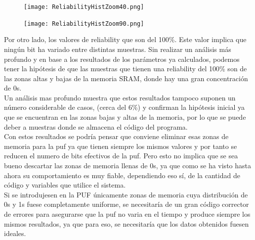 \documentclass[spanish]{template/minim}
\begin{document}
\begin{figure}[H]
    \centering
    \texttt{[image: ReliabilityHistZoom40.png]}
\end{figure}


\begin{figure}[H]
    \centering
    \texttt{[image: ReliabilityHistZoom90.png]}
\end{figure}


Por otro lado, los valores de reliability que son del 100\%. Este valor implica que ningún bit ha variado entre distintas muestras. Sin realizar un análisis más profundo y en base a los resultados de los parámetros ya calculados, podemos tener la hipótesis de que las muestras que tienen una reliability del 100\% son de las zonas altas y bajas de la memoria SRAM, donde hay una gran concentración de 0s.\\

Un análisis mas profundo muestra que estos resultados tampoco suponen un número considerable de casos, (cerca del 6\%) y confirman la hipótesis inicial ya que se encuentran en las zonas bajas y altas de la memoria, por lo que se puede deber a muestras donde se almacena el código del programa.\\

Con estos resultados se podría pensar que conviene eliminar esas zonas de memoria para la \gls{puf} ya que tienen siempre los mismos valores y por tanto se reducen el numero de bits efectivos de la \gls{puf}. Pero esto no implica que se sea bueno descartar las zonas de memoria llenas de 0s, ya que como se ha visto hasta ahora su comportamiento es muy fiable, dependiendo eso sí, de la cantidad de código y variables que utilice el sistema.\\

Si se introdujesen en la PUF únicamente zonas de memoria cuya distribución de 0s y 1s fuese completamente uniforme, se necesitaría de un gran código corrector de errores para asegurarse que la \gls{puf} no varia en el tiempo y produce siempre los mismos resultados, ya que para eso, se necesitaría que los datos obtenidos fuesen ideales.\\
\end{document}
